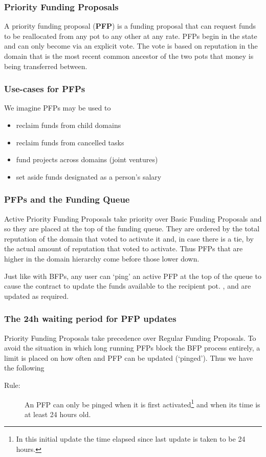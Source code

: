 
%
%
%

\subsubsection{Priority Funding Proposals}
A priority funding proposal (\textbf{PFP}) is a funding proposal that can request funds to be reallocated from any pot to any other at any rate. PFPs begin in the  state and can only become  via an explicit vote. The vote is based on reputation in the domain that is the most recent common ancestor of the two pots that money is being transferred between.

\subsubsection*{Use-cases for PFPs}
We imagine PFPs may be used to
\begin{itemize}
 \item reclaim funds from child domains
 \item reclaim funds from cancelled tasks
 \item fund projects across domains (joint ventures)
 \item set aside funds designated as a person's salary
 \end{itemize}


\subsubsection*{PFPs and the Funding Queue}

Active Priority Funding Proposals take priority over Basic Funding Proposals and so they are placed at the top of the funding queue. They are ordered by the total reputation of the domain that voted to activate it and, in case there is a tie, by the actual amount of reputation that voted to activate. Thus PFPs that are higher in the domain hierarchy come before those lower down.

Just like with BFPs, any user can `ping' an active PFP at the top of the queue to cause the contract to update the funds available to the recipient pot. ,  and  are updated as required.

\subsubsection*{The 24h waiting period for PFP updates}
Priority Funding Proposals take precedence over Regular Funding Proposals. To avoid the situation in which long running PFPs block the BFP process entirely, a limit is placed on how often and PFP can be updated (`pinged'). Thus we have the following
\begin{description}
 \item[Rule:] An PFP can only be pinged when it is first activated\footnote{In this initial update the time elapsed since last update is taken to be 24 hours.} and when its  time is at least 24 hours old.
\end{description}

